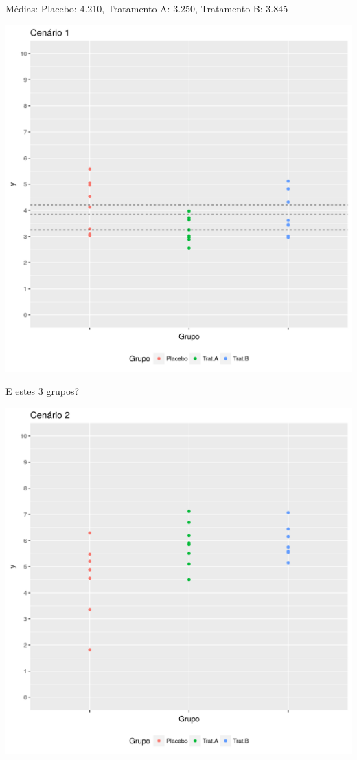 \documentclass{beamer}
\begin{document}
\begin{frame}{Médias: Placebo: 4.210, Tratamento A: 3.250, Tratamento B: 3.845}
  \begin{center}
    \includegraphics[height=.9\textheight]{Cap13-30/cenario1_medias}

  \end{center}
\end{frame}

\begin{frame}{E estes 3 grupos?}
  \begin{center}
    \includegraphics[height=.9\textheight]{Cap13-30/cenario2}
  \end{center}
\end{frame}
\end{document}
